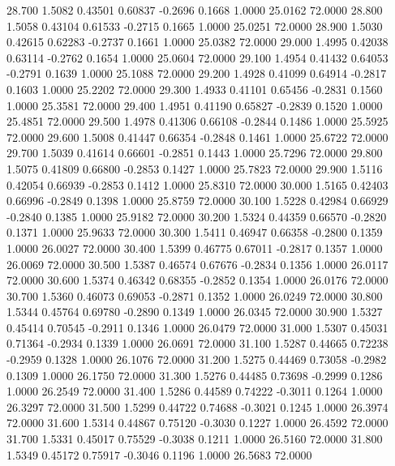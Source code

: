   28.700   1.5082   0.43501   0.60837  -0.2696   0.1668   1.0000  25.0162  72.0000
  28.800   1.5058   0.43104   0.61533  -0.2715   0.1665   1.0000  25.0251  72.0000
  28.900   1.5030   0.42615   0.62283  -0.2737   0.1661   1.0000  25.0382  72.0000
  29.000   1.4995   0.42038   0.63114  -0.2762   0.1654   1.0000  25.0604  72.0000
  29.100   1.4954   0.41432   0.64053  -0.2791   0.1639   1.0000  25.1088  72.0000
  29.200   1.4928   0.41099   0.64914  -0.2817   0.1603   1.0000  25.2202  72.0000
  29.300   1.4933   0.41101   0.65456  -0.2831   0.1560   1.0000  25.3581  72.0000
  29.400   1.4951   0.41190   0.65827  -0.2839   0.1520   1.0000  25.4851  72.0000
  29.500   1.4978   0.41306   0.66108  -0.2844   0.1486   1.0000  25.5925  72.0000
  29.600   1.5008   0.41447   0.66354  -0.2848   0.1461   1.0000  25.6722  72.0000
  29.700   1.5039   0.41614   0.66601  -0.2851   0.1443   1.0000  25.7296  72.0000
  29.800   1.5075   0.41809   0.66800  -0.2853   0.1427   1.0000  25.7823  72.0000
  29.900   1.5116   0.42054   0.66939  -0.2853   0.1412   1.0000  25.8310  72.0000
  30.000   1.5165   0.42403   0.66996  -0.2849   0.1398   1.0000  25.8759  72.0000
  30.100   1.5228   0.42984   0.66929  -0.2840   0.1385   1.0000  25.9182  72.0000
  30.200   1.5324   0.44359   0.66570  -0.2820   0.1371   1.0000  25.9633  72.0000
  30.300   1.5411   0.46947   0.66358  -0.2800   0.1359   1.0000  26.0027  72.0000
  30.400   1.5399   0.46775   0.67011  -0.2817   0.1357   1.0000  26.0069  72.0000
  30.500   1.5387   0.46574   0.67676  -0.2834   0.1356   1.0000  26.0117  72.0000
  30.600   1.5374   0.46342   0.68355  -0.2852   0.1354   1.0000  26.0176  72.0000
  30.700   1.5360   0.46073   0.69053  -0.2871   0.1352   1.0000  26.0249  72.0000
  30.800   1.5344   0.45764   0.69780  -0.2890   0.1349   1.0000  26.0345  72.0000
  30.900   1.5327   0.45414   0.70545  -0.2911   0.1346   1.0000  26.0479  72.0000
  31.000   1.5307   0.45031   0.71364  -0.2934   0.1339   1.0000  26.0691  72.0000
  31.100   1.5287   0.44665   0.72238  -0.2959   0.1328   1.0000  26.1076  72.0000
  31.200   1.5275   0.44469   0.73058  -0.2982   0.1309   1.0000  26.1750  72.0000
  31.300   1.5276   0.44485   0.73698  -0.2999   0.1286   1.0000  26.2549  72.0000
  31.400   1.5286   0.44589   0.74222  -0.3011   0.1264   1.0000  26.3297  72.0000
  31.500   1.5299   0.44722   0.74688  -0.3021   0.1245   1.0000  26.3974  72.0000
  31.600   1.5314   0.44867   0.75120  -0.3030   0.1227   1.0000  26.4592  72.0000
  31.700   1.5331   0.45017   0.75529  -0.3038   0.1211   1.0000  26.5160  72.0000
  31.800   1.5349   0.45172   0.75917  -0.3046   0.1196   1.0000  26.5683  72.0000
